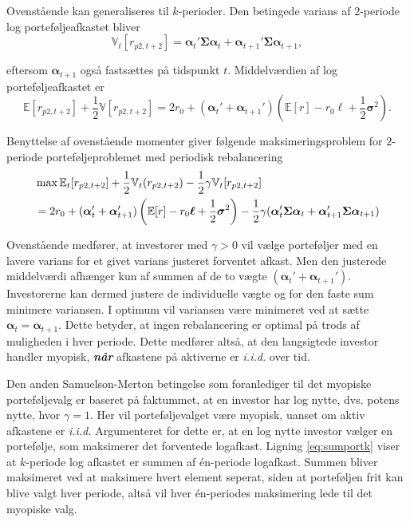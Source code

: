 \documentclass[
  a4paper,
  oneside]{memoir}
\begin{document}
Ovenstående kan generaliseres til \(k\)-perioder. Den betingede varians af \(2\)-periode log porteføljeafkastet bliver
\[\mathbb{V}_t[r_{p2,t+2}]=\bm{\alpha}_t'\bm{\Sigma}\bm{\alpha}_t+\bm{\alpha}_{t+1}'\bm{\Sigma}\bm{\alpha}_{t+1},\]

eftersom \(\bm{\alpha}_{t+1}\) også fastsættes på tidspunkt \(t\). Middelværdien af log porteføljeafkastet er
\[\mathbb{E}[r_{p2,t+2}]+\frac{1}{2}\mathbb{V}[r_{p2,t+2}]=2r_0 + (\bm{\alpha}_t'+\bm{\alpha}_{t+1}')(\mathbb{E}[r]-r_0\bm{\ell}+\frac{1}{2}\bm{\sigma}^2).\]

Benyttelse af ovenstående momenter giver følgende maksimeringsproblem for \(2\)-periode porteføljeproblemet med periodisk rebalancering
\begin{align}
&\max\mathbb{E}_t[r_{p2,t+2}] + \frac{1}{2} \mathbb{V}_t(r_{p2,t+2})-\frac{1}{2}\gamma \mathbb{V}_t[r_{p2,t+2}]\notag \\
&=2r_0+(\bm{\alpha}_t'+\bm{\alpha}_{t+1}')\left(\mathbb{E}[r]-r_0\bm{\ell}+\frac{1}{2}\bm{\sigma}^2\right)-\frac{1}{2}\gamma (\bm{\alpha}_t'\bm{\Sigma}\bm{\alpha}_t+\bm{\alpha}_{t+1}'\bm{\Sigma}\bm{\alpha}_{t+1})
\label{eq:CRRAmakslogk2periode}
\end{align}

Ovenstående medfører, at investorer med \(\gamma>0\) vil vælge porteføljer med en lavere varians for et givet varians justeret forventet afkast. Men den justerede middelværdi afhænger kun af summen af de to vægte \((\bm{\alpha}_t'+\bm{\alpha}_{t+1}')\). Investorerne kan dermed justere de individuelle vægte og for den faste sum minimere variansen. I optimum vil variansen være minimeret ved at sætte \(\bm{\alpha}_t=\bm{\alpha}_{t+1}\). Dette betyder, at ingen rebalancering er optimal på trods af muligheden i hver periode. Dette medfører altså, at den langsigtede investor handler myopisk, \textbf{\emph{når}} afkastene på aktiverne er \emph{i.i.d.} over tid.

Den anden Samuelson-Merton betingelse som foranlediger til det myopiske porteføljevalg er baseret på faktummet, at en investor har log nytte, dvs. potens nytte, hvor \(\gamma=1\). Her vil porteføljevalget være myopisk, uanset om aktiv afkastene er \emph{i.i.d.} Argumenteret for dette er, at en log nytte investor vælger en portefølje, som maksimerer det forventede logafkast. Ligning \eqref{eq:sumportk} viser at \(k\)-periode log afkastet er summen af én-periode logafkast. Summen bliver maksimeret ved at maksimere hvert element seperat, siden at porteføljen frit kan blive valgt hver periode, altså vil hver én-periodes maksimering lede til det myopiske valg.
\end{document}
